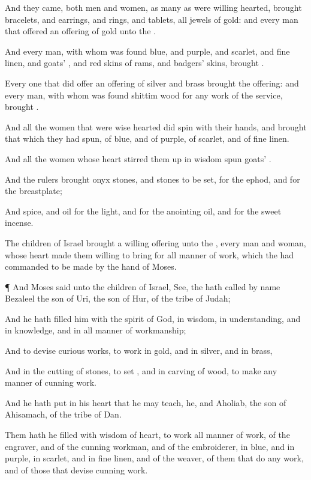 {And they
came,
both
men and
women, as many
as were
willing
hearted,
{}
brought
bracelets, and
earrings, and
rings, and
tablets, all
jewels of
gold: and every
man that
offered
{} an
offering of
gold unto the
{}.

And every
man, with whom was
found
blue, and
purple, and
scarlet, and fine
linen, and
goats’
{}, and
red
skins of
rams, and
badgers’
skins,
brought
{}.

Every one that did
offer an
offering of
silver and
brass
brought the
{}
offering: and every man, with whom was
found
shittim
wood for any
work of the
service,
brought
{}.

And all the
women that were
wise
hearted did
spin with their
hands, and
brought that which they had
spun,
{} of
blue, and of
purple,
{} of
scarlet, and of fine
linen.

And all the
women whose
heart
stirred them up in
wisdom
spun
goats’
{}.

And the
rulers
brought
onyx
stones, and
stones to be
set, for the
ephod, and for the
breastplate;

And
spice, and
oil for the
light, and for the
anointing
oil, and for the
sweet
incense.

The
children of
Israel
brought a willing
offering unto the
{}, every
man and
woman,
whose
heart made them
willing to
bring for all manner of
work, which the
{} had
commanded to be
made by the
hand of
Moses.


\par }{\PP {}¶ And
Moses
said unto the
children of
Israel,
See, the
{} hath
called by
name
Bezaleel the
son of
Uri, the
son of
Hur, of the
tribe of
Judah;

And he hath
filled him with the
spirit of
God, in
wisdom, in
understanding, and in
knowledge, and in all manner of
workmanship;

And to
devise curious
works, to
work in
gold, and in
silver, and in
brass,

And in the
cutting of
stones, to
set
{}, and in
carving of
wood, to
make any manner of
cunning
work.

And he hath
put in his
heart that he may
teach,
{} he, and
Aholiab, the
son of
Ahisamach, of the
tribe of
Dan.

Them hath he
filled with
wisdom of
heart, to
work all manner of
work, of the
engraver, and of the cunning
workman, and of the
embroiderer, in
blue, and in
purple, in
scarlet, and in fine
linen, and of the
weaver,
{} of them that
do
any
work, and of those that
devise cunning
work.




}
